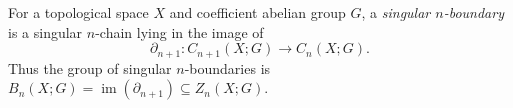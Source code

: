 
For a topological space $X$ and coefficient abelian group $G$, a \emph{singular $n$-boundary} is a singular $n$-chain lying in the image of
\[
\partial_{n+1}:C_{n+1}(X;G)\to C_n(X;G).
\]
Thus the group of singular $n$-boundaries is $B_n(X;G)=\operatorname{im}(\partial_{n+1})\subseteq Z_n(X;G)$.
